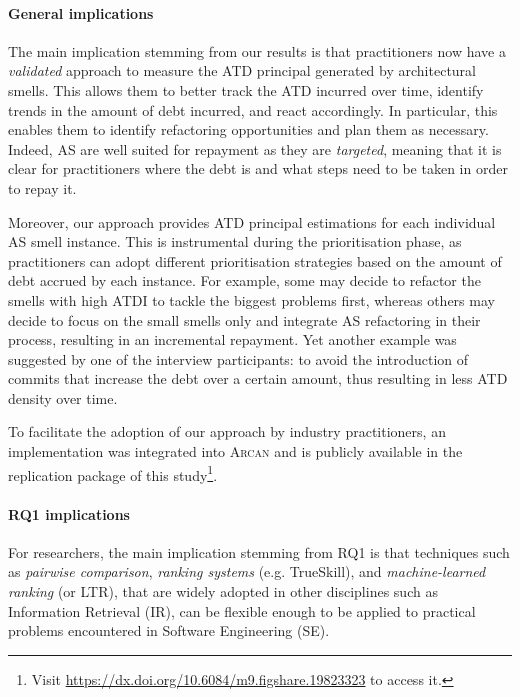 \paragraph{General implications} The main implication stemming from our results is that practitioners now have a \emph{validated} approach to measure the ATD principal generated by architectural smells.
This allows them to better track the ATD incurred over time, identify trends in the amount of debt incurred, and react accordingly. 
In particular, this enables them to identify refactoring opportunities and plan them as necessary.
Indeed, AS are well suited for repayment as they are \emph{targeted}, meaning that it is clear for practitioners where the debt is and what steps need to be taken in order to repay it.

Moreover, our approach provides ATD principal estimations for each individual AS smell instance. 
This is instrumental during the prioritisation phase, as practitioners can adopt different prioritisation strategies based on the amount of debt accrued by each instance.
For example, some may decide to refactor the smells with high ATDI to tackle the biggest problems first, whereas others may decide to focus on the small smells only and integrate AS refactoring in their process, resulting in an incremental repayment.
Yet another example was suggested by one of the interview participants: to avoid the introduction of commits that increase the debt over a certain amount, thus resulting in less ATD density over time.

To facilitate the adoption of our approach by industry practitioners, an implementation was integrated into \textsc{Arcan} and is publicly available in the replication package of this study\footnote{Visit \url{https://dx.doi.org/10.6084/m9.figshare.19823323} to access it.}.

\paragraph{RQ1 implications}
For researchers, the main implication stemming from RQ1 is that techniques such as \emph{pairwise comparison}, \emph{ranking systems} (e.g. TrueSkill), and \emph{machine-learned ranking} (or LTR), that are widely adopted in other disciplines such as Information Retrieval (IR), can be flexible enough to be applied to practical problems encountered in Software Engineering (SE).


